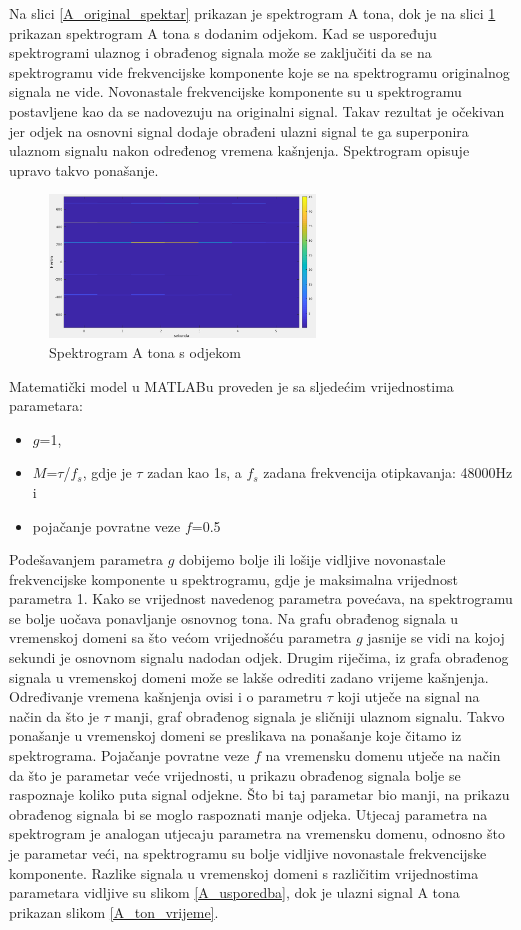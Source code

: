 \documentclass[conference]{IEEEtran}
\begin{document}
Na slici \ref{A_original_spektar} prikazan je spektrogram A tona, dok je na slici \ref{echo} prikazan spektrogram
A tona s dodanim odjekom. Kad se uspoređuju spektrogrami ulaznog i obrađenog signala može se zaključiti da se
na spektrogramu vide frekvencijske komponente koje se na spektrogramu originalnog signala ne vide. Novonastale
frekvencijske komponente su u spektrogramu postavljene kao da se nadovezuju na originalni signal. Takav rezultat je
očekivan jer odjek na osnovni signal dodaje obrađeni ulazni signal te ga superponira ulaznom signalu nakon određenog
vremena kašnjenja. Spektrogram opisuje upravo takvo ponašanje.

\begin{figure}[H]
  \centerline{\includegraphics[width=200pt]{slike/A_ton_echo.png}}
  \caption{Spektrogram A tona s odjekom}
  \label{echo}
\end{figure}

Matematički model u MATLABu proveden je sa sljedećim vrijednostima parametara:
\begin{itemize}
  \item{$g$=1,}
  \item{$M$=$\tau$/$f_{s}$, gdje je $\tau$ zadan kao 1s, a $f_{s}$ zadana frekvencija otipkavanja: 48000Hz i}
  \item{pojačanje povratne veze $f$=0.5}
\end{itemize}

Podešavanjem parametra $g$ dobijemo bolje ili lošije vidljive novonastale frekvencijske komponente u
spektrogramu, gdje je maksimalna vrijednost parametra 1. Kako se vrijednost navedenog parametra povećava, na spektrogramu se bolje uočava ponavljanje
osnovnog tona. Na grafu obrađenog signala u vremenskoj domeni sa što većom vrijednošću parametra $g$ jasnije
se vidi na kojoj sekundi je osnovnom signalu nadodan odjek. Drugim riječima, iz grafa obrađenog signala u vremenskoj domeni
može se lakše odrediti zadano vrijeme kašnjenja. Određivanje vremena kašnjenja ovisi i o parametru $\tau$ koji
utječe na signal na način da što je $\tau$ manji, graf obrađenog signala je sličniji ulaznom signalu. Takvo ponašanje
u vremenskoj domeni se preslikava na ponašanje koje čitamo iz spektrograma.
Pojačanje povratne veze $f$ na vremensku domenu utječe na način da što je parametar veće vrijednosti, u prikazu
obrađenog signala bolje se raspoznaje koliko puta signal odjekne. Što bi taj parametar bio manji, na prikazu obrađenog
signala bi se moglo raspoznati manje odjeka. Utjecaj parametra na spektrogram je analogan utjecaju parametra na vremensku
domenu, odnosno što je parametar veći, na spektrogramu su bolje vidljive novonastale frekvencijske komponente.
Razlike signala u vremenskoj domeni s različitim vrijednostima parametara vidljive su slikom \ref{A_usporedba}, dok je
ulazni signal A tona prikazan slikom \ref{A_ton_vrijeme}.
\end{document}
